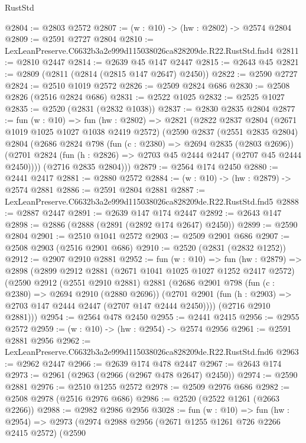 \begin{lexlean}{RustStd}
\begin{coremodule}
@2804 := @2803 @2572
@2807 := (w : @10) -> (hw : @2802) -> @2574 @2804
@2809 := @2591 @2727 @2804
@2810 := LexLeanPreserve.C6632b3a2e999d115038026ca828209de.R22.RustStd.fnd4
@2811 := @2810 @2447
@2814 := @2639 @45 @147 @2447
@2815 := @2643 @45
@2821 := @2809 (@2811 (@2814 (@2815 @147 @2647) @2450))
@2822 := @2590 @2727
@2824 := @2510 @1019 @2572
@2826 := @2509 @2824 @686
@2830 := @2508 @2826 (@2516 @2824 @686)
@2831 := @2522 @1025
@2832 := @2525 @1027
@2835 := @2520 (@2831 (@2832 @1038))
@2837 := @2830 @2835 @2804
@2877 := fun (w : @10) =>
  fun (hw : @2802) =>
  @2821
    (@2822
      @2837
      @2804
      (@2671 @1019 @1025 @1027 @1038 @2419 @2572)
      (@2590
        @2837
        (@2551 @2835 @2804)
        @2804
        (@2686
          @2824
          @798
          (fun (c : @2380) => @2694 @2835 (@2803 @2696))
          (@2701 @2824 (fun (h : @2826) => @2703 @45 @2444 @2447 (@2707 @45 @2444 @2450))))
        (@2716 @2835 @2804)))
@2879 := @2564 @174 @2450
@2880 := @2441 @2417
@2881 := @2880 @2572
@2884 := (w : @10) -> (hw : @2879) -> @2574 @2881
@2886 := @2591 @2804 @2881
@2887 := LexLeanPreserve.C6632b3a2e999d115038026ca828209de.R22.RustStd.fnd5
@2888 := @2887 @2447
@2891 := @2639 @147 @174 @2447
@2892 := @2643 @147
@2898 := @2886 (@2888 (@2891 (@2892 @174 @2647) @2450))
@2899 := @2590 @2804
@2901 := @2510 @1041 @2572
@2903 := @2509 @2901 @686
@2907 := @2508 @2903 (@2516 @2901 @686)
@2910 := @2520 (@2831 (@2832 @1252))
@2912 := @2907 @2910 @2881
@2952 := fun (w : @10) =>
  fun (hw : @2879) =>
  @2898
    (@2899
      @2912
      @2881
      (@2671 @1041 @1025 @1027 @1252 @2417 @2572)
      (@2590
        @2912
        (@2551 @2910 @2881)
        @2881
        (@2686
          @2901
          @798
          (fun (c : @2380) => @2694 @2910 (@2880 @2696))
          (@2701 @2901 (fun (h : @2903) => @2703 @147 @2444 @2447 (@2707 @147 @2444 @2450))))
        (@2716 @2910 @2881)))
@2954 := @2564 @478 @2450
@2955 := @2441 @2415
@2956 := @2955 @2572
@2959 := (w : @10) -> (hw : @2954) -> @2574 @2956
@2961 := @2591 @2881 @2956
@2962 := LexLeanPreserve.C6632b3a2e999d115038026ca828209de.R22.RustStd.fnd6
@2963 := @2962 @2447
@2966 := @2639 @174 @478 @2447
@2967 := @2643 @174
@2973 := @2961 (@2963 (@2966 (@2967 @478 @2647) @2450))
@2974 := @2590 @2881
@2976 := @2510 @1255 @2572
@2978 := @2509 @2976 @686
@2982 := @2508 @2978 (@2516 @2976 @686)
@2986 := @2520 (@2522 @1261 (@2663 @2266))
@2988 := @2982 @2986 @2956
@3028 := fun (w : @10) =>
  fun (hw : @2954) =>
  @2973
    (@2974
      @2988
      @2956
      (@2671 @1255 @1261 @726 @2266 @2415 @2572)
      (@2590

\end{coremodule}
\end{lexlean}
